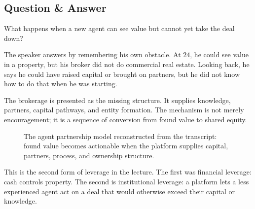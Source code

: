 \subsection{Question \& Answer}

What happens when a new agent can see value but cannot yet take the deal down?

The speaker answers by remembering his own obstacle. At \(24\), he could see value in a property, but his broker did not do commercial real estate. Looking back, he says he could have raised capital or brought on partners, but he did not know how to do that when he was starting.

The brokerage is presented as the missing structure. It supplies knowledge, partners, capital pathways, and entity formation. The mechanism is not merely encouragement; it is a sequence of conversion from found value to shared equity.

\begin{figure}
\centering
{}
\caption{The agent partnership model reconstructed from the transcript: found value becomes actionable when the platform supplies capital, partners, process, and ownership structure.}
\end{figure}

This is the second form of leverage in the lecture. The first was financial leverage: cash controls property. The second is institutional leverage: a platform lets a less experienced agent act on a deal that would otherwise exceed their capital or knowledge.

